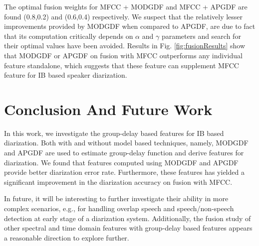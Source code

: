 \documentclass[conference]{IEEEtran}
\begin{document}
The optimal fusion weights for MFCC + MODGDF and MFCC + APGDF are found (0.8,0.2) and
(0.6,0.4) respectively. We suspect that the relatively lesser improvements provided by
MODGDF when compared to APGDF, are due to fact that its computation critically depends on $\alpha$ and $\gamma$ parameters and search for their optimal values have been avoided. 
Results in Fig. \ref{fig:fusionResults} show that MODGDF or APGDF on fusion with MFCC outperforms any individual feature standalone, which suggests that these feature can supplement MFCC feature for IB based speaker diarization.

\section{Conclusion And Future Work}
\label{conclude}

In this work, we investigate the group-delay based features for IB based
diarization. Both with and without model based techniques, namely,
MODGDF and APGDF are used to estimate group-delay function and derive features for diarization. 
We found that features computed using MODGDF and APGDF provide better diarization error rate. 
Furthermore, these features has yielded a significant improvement in the diarization accuracy 
on fusion with MFCC. 

In future, it will be interesting to further investigate their ability in
more complex scenarios, e.g., for handling overlap speech and speech/non-speech
detection at early stage of a diarization system. Additionally, the fusion study of
other spectral and time domain features with group-delay based features appears
a reasonable direction to explore further. 



\end{document}
